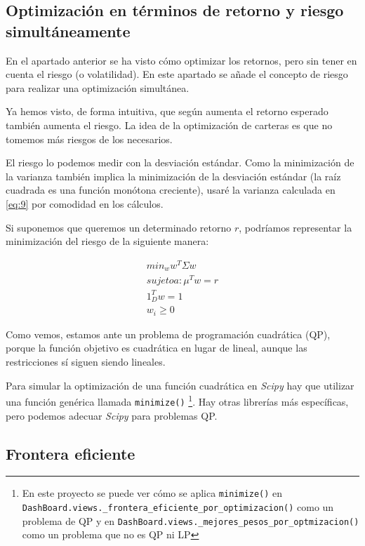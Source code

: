 \subsection{Optimización en términos de retorno y riesgo simultáneamente}

En el apartado anterior se ha visto cómo optimizar los retornos, pero sin tener en cuenta el riesgo (o volatilidad). En este apartado se añade el concepto de riesgo para realizar una optimización simultánea. 

Ya hemos visto, de forma intuitiva, que según aumenta el retorno esperado también aumenta el riesgo. La idea de la optimización de carteras es que no tomemos más riesgos de los necesarios. 

El riesgo lo podemos medir con la desviación estándar. Como la minimización de la varianza también implica la minimización de la desviación estándar (la raíz cuadrada es una función monótona creciente), usaré la varianza calculada en \ref{eq:9} por comodidad en los cálculos.

Si suponemos que queremos un determinado retorno $r$, podríamos representar la minimización del riesgo de la siguiente manera:

\begin{equation} \label{eq:10}
\begin{aligned}
	min_{w} w^{T}\Sigma w \\
	sujeto a: \mu^{T}w = r \\
	1_{D}^{T}w = 1 \\
	w_{i} \geq 0
\end{aligned}
\end{equation}

Como vemos, estamos ante un problema de programación cuadrática (QP), porque la función objetivo es cuadrática en lugar de lineal, aunque las restricciones sí siguen siendo lineales. 

Para simular la optimización de una función cuadrática en \emph{Scipy} hay que utilizar una función genérica llamada \texttt{minimize()} \footnote{En este proyecto se puede ver cómo se aplica \texttt{minimize()} en \texttt{DashBoard.views.\_frontera\_eficiente\_por\_optimizacion()} como un problema de QP y en \texttt{DashBoard.views.\_mejores\_pesos\_por\_optmizacion()} como un problema que no es QP ni LP}. Hay otras librerías más específicas, pero podemos adecuar \emph{Scipy} para problemas QP.


\subsection{Frontera eficiente}


